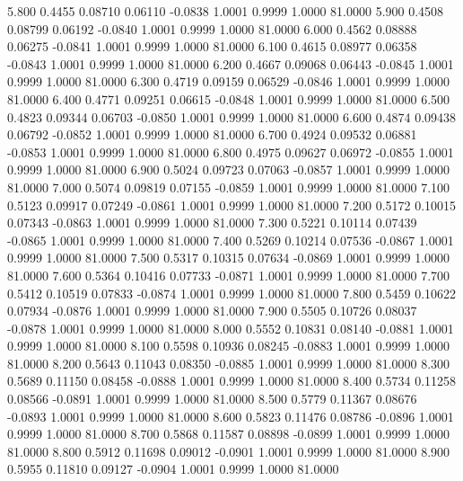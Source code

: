    5.800   0.4455   0.08710   0.06110  -0.0838   1.0001   0.9999   1.0000  81.0000
   5.900   0.4508   0.08799   0.06192  -0.0840   1.0001   0.9999   1.0000  81.0000
   6.000   0.4562   0.08888   0.06275  -0.0841   1.0001   0.9999   1.0000  81.0000
   6.100   0.4615   0.08977   0.06358  -0.0843   1.0001   0.9999   1.0000  81.0000
   6.200   0.4667   0.09068   0.06443  -0.0845   1.0001   0.9999   1.0000  81.0000
   6.300   0.4719   0.09159   0.06529  -0.0846   1.0001   0.9999   1.0000  81.0000
   6.400   0.4771   0.09251   0.06615  -0.0848   1.0001   0.9999   1.0000  81.0000
   6.500   0.4823   0.09344   0.06703  -0.0850   1.0001   0.9999   1.0000  81.0000
   6.600   0.4874   0.09438   0.06792  -0.0852   1.0001   0.9999   1.0000  81.0000
   6.700   0.4924   0.09532   0.06881  -0.0853   1.0001   0.9999   1.0000  81.0000
   6.800   0.4975   0.09627   0.06972  -0.0855   1.0001   0.9999   1.0000  81.0000
   6.900   0.5024   0.09723   0.07063  -0.0857   1.0001   0.9999   1.0000  81.0000
   7.000   0.5074   0.09819   0.07155  -0.0859   1.0001   0.9999   1.0000  81.0000
   7.100   0.5123   0.09917   0.07249  -0.0861   1.0001   0.9999   1.0000  81.0000
   7.200   0.5172   0.10015   0.07343  -0.0863   1.0001   0.9999   1.0000  81.0000
   7.300   0.5221   0.10114   0.07439  -0.0865   1.0001   0.9999   1.0000  81.0000
   7.400   0.5269   0.10214   0.07536  -0.0867   1.0001   0.9999   1.0000  81.0000
   7.500   0.5317   0.10315   0.07634  -0.0869   1.0001   0.9999   1.0000  81.0000
   7.600   0.5364   0.10416   0.07733  -0.0871   1.0001   0.9999   1.0000  81.0000
   7.700   0.5412   0.10519   0.07833  -0.0874   1.0001   0.9999   1.0000  81.0000
   7.800   0.5459   0.10622   0.07934  -0.0876   1.0001   0.9999   1.0000  81.0000
   7.900   0.5505   0.10726   0.08037  -0.0878   1.0001   0.9999   1.0000  81.0000
   8.000   0.5552   0.10831   0.08140  -0.0881   1.0001   0.9999   1.0000  81.0000
   8.100   0.5598   0.10936   0.08245  -0.0883   1.0001   0.9999   1.0000  81.0000
   8.200   0.5643   0.11043   0.08350  -0.0885   1.0001   0.9999   1.0000  81.0000
   8.300   0.5689   0.11150   0.08458  -0.0888   1.0001   0.9999   1.0000  81.0000
   8.400   0.5734   0.11258   0.08566  -0.0891   1.0001   0.9999   1.0000  81.0000
   8.500   0.5779   0.11367   0.08676  -0.0893   1.0001   0.9999   1.0000  81.0000
   8.600   0.5823   0.11476   0.08786  -0.0896   1.0001   0.9999   1.0000  81.0000
   8.700   0.5868   0.11587   0.08898  -0.0899   1.0001   0.9999   1.0000  81.0000
   8.800   0.5912   0.11698   0.09012  -0.0901   1.0001   0.9999   1.0000  81.0000
   8.900   0.5955   0.11810   0.09127  -0.0904   1.0001   0.9999   1.0000  81.0000
